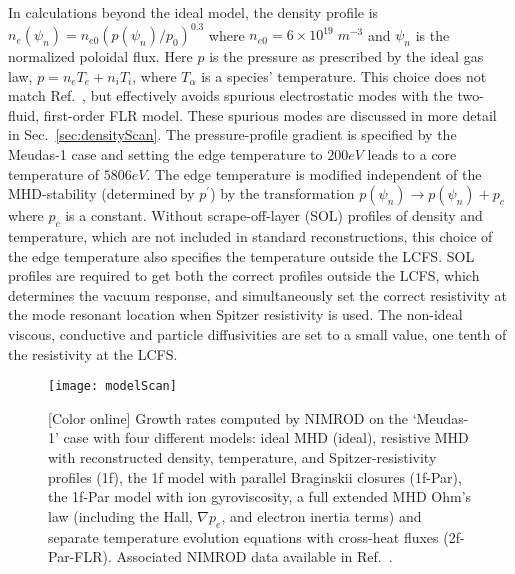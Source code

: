 In calculations beyond the ideal model, the density profile is
$n_e(\psi_n)=n_{e0} (p(\psi_n)/p_0)^{0.3}$ where
$n_{e0}=6\times10^{19}\;m^{-3}$ and $\psi_n$ is the normalized poloidal flux.
Here $p$ is the pressure as prescribed by the ideal gas law, $p=n_e T_e+ n_i
T_i$, where $T_\alpha$ is a species' temperature. This choice does not match
Ref.~\cite{Ferraro10}, but effectively avoids spurious electrostatic modes with
the two-fluid, first-order FLR model. These spurious modes are discussed in 
more detail in Sec.~\ref{sec:densityScan}.
The pressure-profile gradient is specified by the Meudas-1 case and setting the
edge temperature to $200 eV$ leads to a core temperature of $5806 eV$.  The
edge temperature is modified independent of the MHD-stability (determined by
$p^\prime$) by the transformation $p(\psi_n) \rightarrow p(\psi_n) + p_c$ where
$p_c$ is a constant. Without scrape-off-layer (SOL) profiles of density and temperature, which are
not included in standard reconstructions, this choice of the edge temperature
also specifies the temperature outside the LCFS.  SOL profiles are required to
get both the correct profiles outside the LCFS, which determines the vacuum
response, and simultaneously set the correct resistivity at the mode resonant
location when Spitzer resistivity is used.  The non-ideal viscous, conductive
and particle diffusivities are set to a small value, one tenth of the
resistivity at the LCFS. 

\begin{figure}
  \centering
  \texttt{[image: modelScan]}
  \vspace{-4mm}
  \caption{[Color online]
  Growth rates computed by NIMROD on the `Meudas-1' case with four different
  models: ideal MHD (ideal), resistive MHD with reconstructed density,
  temperature, and Spitzer-resistivity profiles (1f), the 1f model with parallel
  Braginskii closures (1f-Par), the 1f-Par model with ion gyroviscosity, a full
  extended MHD Ohm's law (including the Hall, $\nabla p_e$, and electron inertia
  terms) and separate temperature evolution equations with cross-heat fluxes
  (2f-Par-FLR).
  Associated NIMROD data available in Ref.~\cite{king16Z}.}
  \label{modelScan}
\end{figure}

